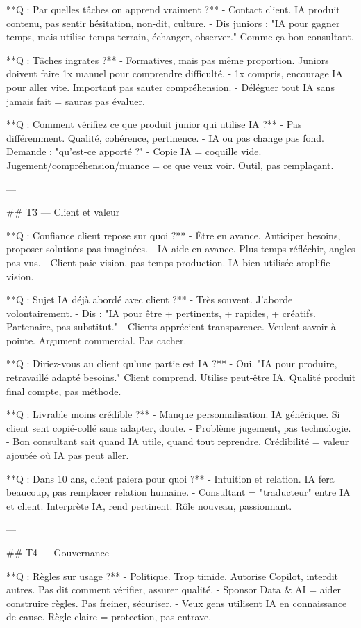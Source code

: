 **Q : Par quelles tâches on apprend vraiment ?**
- Contact client. IA produit contenu, pas sentir hésitation, non-dit, culture.
- Dis juniors : "IA pour gagner temps, mais utilise temps terrain, échanger, observer." Comme ça bon consultant.

**Q : Tâches ingrates ?**
- Formatives, mais pas même proportion. Juniors doivent faire 1x manuel pour comprendre difficulté.
- 1x compris, encourage IA pour aller vite. Important pas sauter compréhension.
- Déléguer tout IA sans jamais fait = sauras pas évaluer.

**Q : Comment vérifiez ce que produit junior qui utilise IA ?**
- Pas différemment. Qualité, cohérence, pertinence.
- IA ou pas change pas fond. Demande : "qu'est-ce apporté ?"
- Copie IA = coquille vide. Jugement/compréhension/nuance = ce que veux voir. Outil, pas remplaçant.

---

## T3 — Client et valeur

**Q : Confiance client repose sur quoi ?**
- Être en avance. Anticiper besoins, proposer solutions pas imaginées.
- IA aide en avance. Plus temps réfléchir, angles pas vus.
- Client paie vision, pas temps production. IA bien utilisée amplifie vision.

**Q : Sujet IA déjà abordé avec client ?**
- Très souvent. J'aborde volontairement.
- Dis : "IA pour être + pertinents, + rapides, + créatifs. Partenaire, pas substitut."
- Clients apprécient transparence. Veulent savoir à pointe. Argument commercial. Pas cacher.

**Q : Diriez-vous au client qu'une partie est IA ?**
- Oui. "IA pour produire, retravaillé adapté besoins." Client comprend. Utilise peut-être IA. Qualité produit final compte, pas méthode.

**Q : Livrable moins crédible ?**
- Manque personnalisation. IA générique. Si client sent copié-collé sans adapter, doute.
- Problème jugement, pas technologie.
- Bon consultant sait quand IA utile, quand tout reprendre. Crédibilité = valeur ajoutée où IA pas peut aller.

**Q : Dans 10 ans, client paiera pour quoi ?**
- Intuition et relation. IA fera beaucoup, pas remplacer relation humaine.
- Consultant = "traducteur" entre IA et client. Interprète IA, rend pertinent. Rôle nouveau, passionnant.

---

## T4 — Gouvernance

**Q : Règles sur usage ?**
- Politique. Trop timide. Autorise Copilot, interdit autres. Pas dit comment vérifier, assurer qualité.
- Sponsor Data & AI = aider construire règles. Pas freiner, sécuriser.
- Veux gens utilisent IA en connaissance de cause. Règle claire = protection, pas entrave.

